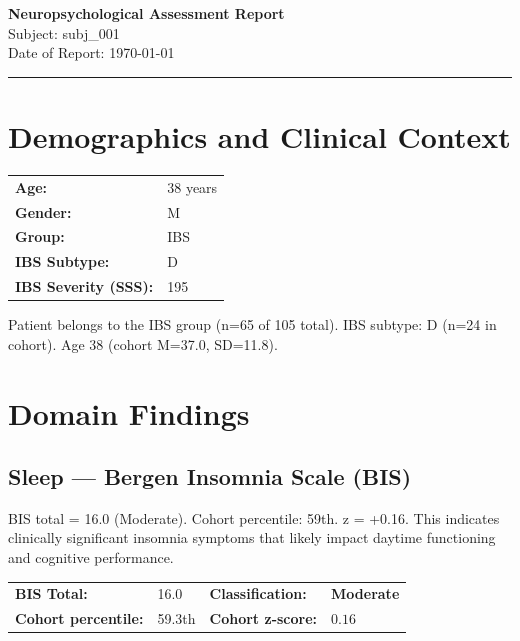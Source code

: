 \documentclass[11pt,a4paper]{article}
\begin{document}
\begin{center}
{\LARGE\bfseries Neuropsychological Assessment Report}\\[0.5em]
{\large Subject: subj\_001}\\[0.3em]
{\normalsize Date of Report: \today}
\end{center}

\vspace{0.5em}
\noindent\rule{\textwidth}{0.4pt}

\section{Demographics and Clinical Context}

\begin{tabular}{ll}
\textbf{Age:} & 38 years \\
\textbf{Gender:} & M \\
\textbf{Group:} & IBS \\
\textbf{IBS Subtype:} & D \\
\textbf{IBS Severity (SSS):} & 195 \\
\end{tabular}

\medskip\noindent Patient belongs to the IBS group (n=65 of 105 total). IBS subtype: D (n=24 in cohort). Age 38 (cohort M=37.0, SD=11.8). 

\section{Domain Findings}

\subsection{Sleep --- Bergen Insomnia Scale (BIS)}
BIS total = 16.0 (Moderate). Cohort percentile: 59th. z = +0.16. This indicates clinically significant insomnia symptoms that likely impact daytime functioning and cognitive performance.

\noindent\begin{tabular}{llll}
\textbf{BIS Total:} & 16.0 &
\textbf{Classification:} & \textbf{Moderate} \\
\textbf{Cohort percentile:} & 59.3th &
\textbf{Cohort z-score:} & $0.16$ \\
\end{tabular}
\end{document}
